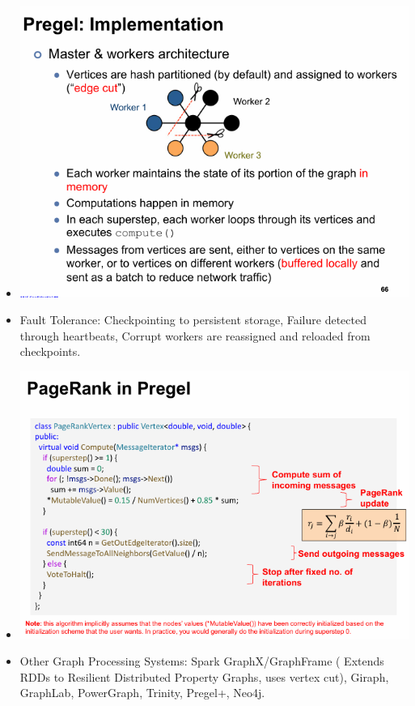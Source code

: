 \documentclass[10pt, landscape]{article}
\begin{document}
\begin{multicols*}{4}
\begin{itemize}
      \item \includegraphics*[width=0.95\linewidth]{pregel_architecture.png}
      \item Fault Tolerance: Checkpointing to persistent storage, Failure detected through heartbeats, Corrupt workers are reassigned and reloaded from checkpoints.
      \item \includegraphics*[width=0.95\linewidth]{pregel_pagerank.png}
      \item Other Graph Processing Systems: Spark GraphX/GraphFrame ( Extends RDDs to Resilient Distributed Property Graphs, uses vertex cut), Giraph, GraphLab, PowerGraph, Trinity, Pregel+, Neo4j.

\end{itemize}
\end{multicols*}
\end{document}
